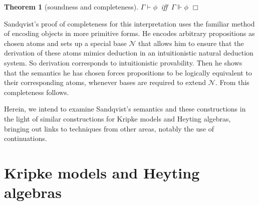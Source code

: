 \documentclass{sn-jnl}
\newcommand{\base}[1]{\mathscr{#1}}
\newtheorem{theorem}{Theorem}
\newcommand{\fillBox}{\hfill$\Box$}
\begin{document}
\smallskip 

\begin{theorem}[soundness and completeness] \label{sec:s-and-c}
$\Gamma \vdash \phi$ \,iff\, $\Gamma \Vdash \phi$ \fillBox
\end{theorem}

\smallskip 

Sandqvist's proof of completeness for this interpretation uses the familiar method of encoding objects in more primitive forms. He encodes arbitrary propositions as chosen atoms and sets up a special base $\base{N}$ that allows him to ensure that the derivation of these atoms mimics deduction in an intuitionistic natural deduction system. So derivation corresponds to intuitionistic provability. Then he shows that the semantics he has chosen forces propositions to be logically equivalent to their corresponding atoms, whenever bases are required to extend $\base{N}$. From this completeness follows. 

Herein, we intend to examine Sandqvist's semantics and these constructions in the light of similar constructions for Kripke models and Heyting algebras, bringing out links to techniques from other areas, notably the use of continuations. 

\section{Kripke models and Heyting algebras}\label{sec:KripkeHeyting}
\end{document}
